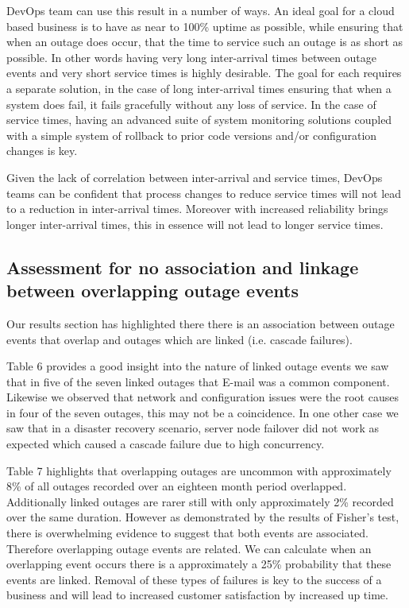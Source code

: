 \documentclass[5p]{elsarticle}
\begin{document}
DevOps team can use this result in a number of ways. An ideal goal for a cloud based business is to have as near to 100\% uptime as possible, while ensuring that when an outage does occur, that the time to service such an outage is as short as possible. In other words having very long inter-arrival times between outage events and very short service times is highly desirable. The goal for each requires a separate solution, in the case of long inter-arrival times ensuring that when a system does fail, it fails gracefully without any loss of service. In the case of service times, having an advanced suite of system monitoring solutions coupled with a simple system of rollback to prior code versions and/or configuration changes is key. 

Given the lack of correlation between inter-arrival and service times, DevOps teams can be confident that process changes to reduce service times will not lead to a reduction in inter-arrival times. Moreover with increased reliability brings longer inter-arrival times, this in essence will not lead to longer service times.


\subsection{Assessment for no association and linkage between overlapping outage events}

Our results section has highlighted there there is an association between outage events that overlap and outages which are linked (i.e. cascade failures).

Table 6 provides a good insight into the nature of linked outage events we saw that in five of the seven linked outages that E-mail was a common component. Likewise we observed that network and configuration issues were the root causes in four of the seven outages, this may not be a coincidence. In one other case we saw that in a disaster recovery scenario, server node failover did not work as expected which caused a cascade failure due to high concurrency.

Table 7 highlights that overlapping outages are uncommon with approximately 8\% of all outages recorded over an eighteen month period overlapped. Additionally linked outages are rarer still with only approximately 2\% recorded over the same duration. However as demonstrated by the results of Fisher's test, there is overwhelming evidence to suggest that both events are associated. Therefore overlapping outage events are related. We can calculate when an overlapping event occurs there is a approximately a 25\% probability that these events are linked. Removal of these types of failures is key to the success of a business and will lead to increased customer satisfaction by increased up time. 
\end{document}
